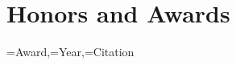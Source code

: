 

\section{Honors and Awards}
\noindent
{}
{\award=Award,\year=Year,\citation=Citation}
{\award\DTLifnullorempty{\citation}{}{~\cite{\citation}} \hfill \year\\
}
